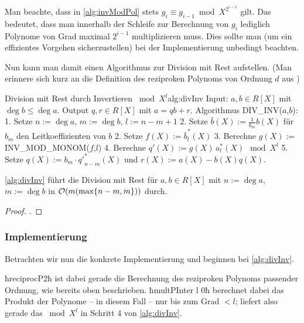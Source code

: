 \begin{bemerkung}
  \label{bem:divPInv}
  Man beachte, dass in \autoref{alg:invModPol} stets $g_i \equiv g_{i-1} \bmod
  X^{2^{i-1}}$ gilt. Das bedeutet, dass man innerhalb der Schleife zur
  Berechnung von $g_i$ lediglich Polynome von Grad maximal $2^{i-1}$
  multiplizieren muss. Dies sollte man (um ein effizientes Vorgehen
  sicherzustellen) bei der Implementierung unbedingt beachten.
\end{bemerkung}

Nun kann man damit einen Algorithmus zur Division mit Rest aufstellen. (Man
erinnere sich kurz an die Definition des reziproken Polynoms von Ordnung $d$
aus )

\begin{pseudocode}{Division mit Rest durch Invertieren $\bmod X^l$}{alg:divInv}
Input: $a,b\in R[X]$ mit $\deg b \leq \deg a$.
Output $q,r \in R[X]$ mit $a = qb + r$.
Algorithmus DIV_INV($a$,$b$):
  1. Setze $n := \deg a$, $m := \deg b$, $l:= n-m+1$
  2. Setze $\bar b(X) := \tfrac{1}{b_m} b(X)$ für $b_m$ den Leitkoeffizienten von $b$
  2. Setze $f(X) := \bar b^\ast_l(X)$
  3. Berechne $g(X) := $ INV_MOD_MONOM($f$,$l$)
  4. Berechne $q'(X) := g(X)\,a^\ast_l(X)\ \bmod X^l$
  5. Setze $q(X) := b_m \cdot {q'}^\ast_{n-m}(X)$ und $r(X) := a(X) - b(X) q(X)$.
\end{pseudocode}

\begin{thm}
  \autoref{alg:divInv} führt die Division mit Rest für $a,b\in R[X]$ mit
  $n := \deg a$, $m := \deg b$ in $\mathcal{O}(m(\max\{n-m,m\}))$ durch.
\end{thm}
\begin{proof}
  \cite[Theorem 3]{divHensel}.
\end{proof}

\subsubsection{Implementierung}

Betrachten wir nun die konkrete Implementierung und beginnen bei 
\autoref{alg:divInv}.


ħreciprocP2ħ ist dabei gerade die Berechnung des reziproken Polynoms passender
Ordnung, wie bereits oben beschrieben. ħmultPInter l 0ħ berechnet dabei das
Produkt der Polynome -- in diesem Fall -- nur bis zum Grad $<l$; liefert also
gerade das $\bmod X^l$ in Schritt 4 von \autoref{alg:divInv}.

